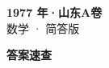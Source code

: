 \documentclass[zihao=-4, a4paper]{ctexart}
\begin{document}
\begin{center}
  {\Large\bfseries 1977 年·山东A卷}\\[4pt]
  {\large 数学 · 简答版}
\end{center}
\medskip
{}

\clearpage
{}
\begin{center}{\Large\bfseries 答案速查}\end{center}
\medskip

\end{document}
